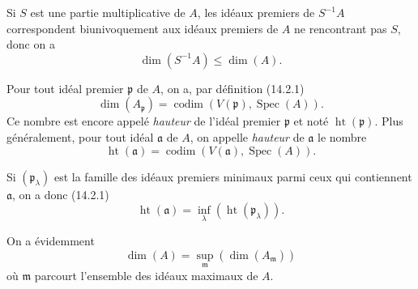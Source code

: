 \begin{env}[16.1.3]
\label{0.16.1.3-fr}
Si $S$ est une partie multiplicative de $A$, les idéaux premiers de $S^{-1}A$
correspondent biunivoquement aux idéaux premiers de $A$ ne rencontrant pas
$S$, donc on a
\[
\label{0.16.1.3.1-fr}
  \dim(S^{-1}A)\leq\dim(A).
\tag{16.1.3.1}
\]

Pour tout idéal premier $\mathfrak{p}$ de $A$, on a, par définition (14.2.1)
\[
\label{0.16.1.3.2-fr}
  \dim(A_{\mathfrak{p}})
  =\operatorname{codim}(V(\mathfrak{p}),\operatorname{Spec}(A)).
\tag{16.1.3.2}
\]
Ce nombre est encore appelé \emph{hauteur} de l'idéal premier $\mathfrak{p}$ et noté
$\operatorname{ht}(\mathfrak{p})$. Plus généralement, pour tout idéal
$\mathfrak{a}$ de $A$, on appelle \emph{hauteur} de $\mathfrak{a}$ le nombre
\[
\label{0.16.1.3.3-fr}
  \operatorname{ht}(\mathfrak{a})
  =\operatorname{codim}(V(\mathfrak{a}),\operatorname{Spec}(A)).
\tag{16.1.3.3}
\]

Si $(\mathfrak{p}_\lambda)$ est la famille des idéaux premiers minimaux parmi
ceux qui contiennent $\mathfrak{a}$, on a donc (14.2.1)
\[
\label{0.16.1.3.4-fr}
  \operatorname{ht}(\mathfrak{a})
  =\inf_\lambda(\operatorname{ht}(\mathfrak{p}_\lambda)).
\tag{16.1.3.4}
\]

On a évidemment
\[
\label{0.16.1.3.5-fr}
  \dim(A)=\sup_{\mathfrak{m}}(\dim(A_{\mathfrak{m}}))
\tag{16.1.3.5}
\]
où $\mathfrak{m}$ parcourt l'ensemble des idéaux maximaux de $A$.
\end{env}


